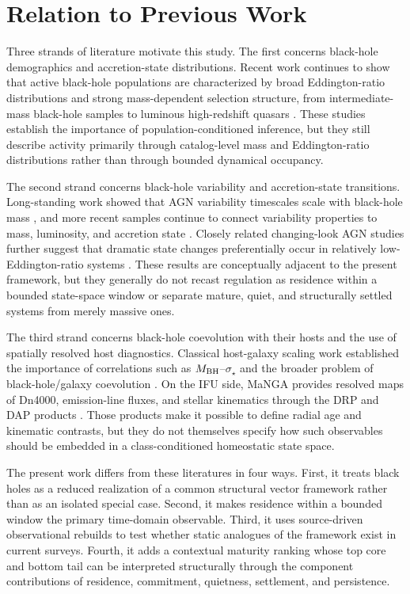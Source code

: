 \documentclass[11pt]{article}
\begin{document}
\section{Relation to Previous Work}

Three strands of literature motivate this study. The first concerns black-hole demographics and accretion-state distributions. Recent work continues to show that active black-hole populations are characterized by broad Eddington-ratio distributions and strong mass-dependent selection structure, from intermediate-mass black-hole samples to luminous high-redshift quasars \citep{Cho2024,He2024}. These studies establish the importance of population-conditioned inference, but they still describe activity primarily through catalog-level mass and Eddington-ratio distributions rather than through bounded dynamical occupancy.

The second strand concerns black-hole variability and accretion-state transitions. Long-standing work showed that AGN variability timescales scale with black-hole mass \citep{McHardy2006}, and more recent samples continue to connect variability properties to mass, luminosity, and accretion state \citep{Tortosa2023,Georgakakis2024,Serafinelli2024}. Closely related changing-look AGN studies further suggest that dramatic state changes preferentially occur in relatively low-Eddington-ratio systems \citep{Ricci2022,Zeltyn2024,Jana2025}. These results are conceptually adjacent to the present framework, but they generally do not recast regulation as residence within a bounded state-space window or separate mature, quiet, and structurally settled systems from merely massive ones.

The third strand concerns black-hole coevolution with their hosts and the use of spatially resolved host diagnostics. Classical host-galaxy scaling work established the importance of correlations such as $M_{\rm BH}$--$\sigma_\star$ and the broader problem of black-hole/galaxy coevolution \citep{KormendyHo2013,HeckmanBest2014}. On the IFU side, MaNGA provides resolved maps of Dn4000, emission-line fluxes, and stellar kinematics through the DRP and DAP products \citep{Belfiore2019,Westfall2019}. Those products make it possible to define radial age and kinematic contrasts, but they do not themselves specify how such observables should be embedded in a class-conditioned homeostatic state space.

The present work differs from these literatures in four ways. First, it treats black holes as a reduced realization of a common structural vector framework rather than as an isolated special case. Second, it makes residence within a bounded window the primary time-domain observable. Third, it uses source-driven observational rebuilds to test whether static analogues of the framework exist in current surveys. Fourth, it adds a contextual maturity ranking whose top core and bottom tail can be interpreted structurally through the component contributions of residence, commitment, quietness, settlement, and persistence.
\end{document}
